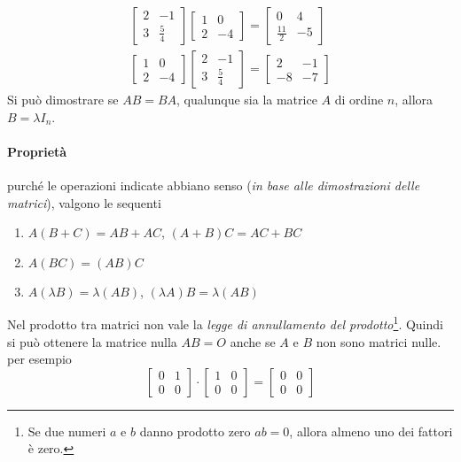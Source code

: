 \begin{es}
  \label{es:prodmtxrigcol2}
  \begin{eqnarray*}
    \begin{bmatrix}
      2 & -1\\
      3 & \frac{5}{4}
    \end{bmatrix}
    \begin{bmatrix}
      1 & 0 \\
      2 & -4
    \end{bmatrix}=
    \begin{bmatrix}
      0 & 4\\
      \frac{11}{2} & -5
    \end{bmatrix}\\
    \begin{bmatrix}
      1 & 0 \\
      2 & -4
    \end{bmatrix}
    \begin{bmatrix}
      2 & -1 \\
      3 & \frac{5}{4}
    \end{bmatrix}=
    \begin{bmatrix}
      2 & -1 \\
      -8 & -7
    \end{bmatrix}
  \end{eqnarray*}
  Si può dimostrare se $AB=BA$, qualunque sia la matrice $A$ di ordine $n$, allora
  $B=\lambda I_n$.
  
  \paragraph{Proprietà} purché le operazioni indicate abbiano senso (\textit{in base
    alle dimostrazioni delle matrici}), valgono le sequenti
  \begin{enumerate}
  \item $A(B+C)=AB+AC$, $(A+B)C=AC+BC$
  \item $A(BC)=(AB)C$
  \item $A(\lambda B)=\lambda (AB)$, $(\lambda A)B=\lambda(AB)$
  \end{enumerate}
\end{es}
\begin{oss}
  \label{oss:prodmtxrigcol2}
  Nel prodotto tra matrici non vale la \textit{legge di annullamento del
    prodotto}\footnote{Se due numeri $a$ e $b$ danno prodotto zero $ab=0$, allora
    almeno uno dei fattori è zero.}. Quindi si può ottenere la matrice nulla $AB=O$
  anche se $A$ e $B$ non sono matrici nulle. per esempio
  \begin{equation*}
    \begin{bmatrix}
      0 & 1 \\
      0 & 0
    \end{bmatrix}\cdot
    \begin{bmatrix}
      1 & 0 \\
      0 & 0
    \end{bmatrix} =
    \begin{bmatrix}
      0 & 0 \\
      0 & 0
    \end{bmatrix}
  \end{equation*}
\end{oss}
